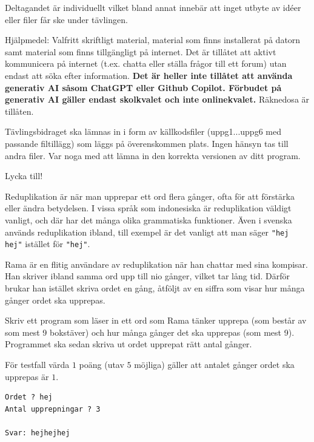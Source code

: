 \begin{lista}
\item Deltagandet är individuellt vilket bland annat innebär att inget utbyte av idéer eller 
filer får ske under tävlingen.  
\item Hjälpmedel: Valfritt skriftligt material, material som finns installerat på datorn samt material som finns tillgängligt på internet.
Det är  tillåtet att aktivt kommunicera på internet (t.ex. chatta eller ställa frågor till ett forum) utan endast att söka efter information.
{\bf Det är heller inte tillåtet att använda generativ AI såsom ChatGPT eller Github Copilot. Förbudet på generativ AI gäller endast skolkvalet och inte onlinekvalet.}
Räknedosa är tillåten.
\item Tävlingsbidraget ska lämnas in i form av källkodsfiler (uppg1...uppg6 med passande filtillägg) som läggs på överenskommen plats. Ingen hänsyn tas till andra filer. Var noga 
med att lämna in den korrekta versionen av ditt program.  
\end{lista}

\begin{center}
\Large Lycka till!
\end{center}
%

\newpage
{}

Reduplikation är när man upprepar ett ord flera gånger, ofta för att förstärka eller ändra betydelsen.
I vissa språk som indonesiska är reduplikation väldigt vanligt, och där har det många olika
grammatiska funktioner. Även i svenska används reduplikation ibland, till exempel är det vanligt
att man säger \texttt{"hej hej"} istället för \texttt{"hej"}.

Rama är en flitig användare av reduplikation när han chattar med sina kompisar. Han skriver ibland samma ord
upp till nio gånger, vilket tar lång tid. Därför brukar han istället skriva ordet en gång, åtföljt av en
siffra som visar hur många gånger ordet ska upprepas.

Skriv ett program som läser in ett ord som Rama tänker upprepa (som består av som mest 9 bokstäver)
och hur många gånger det ska upprepas (som mest 9). 
Programmet ska sedan skriva ut ordet upprepat rätt antal gånger.


 För testfall värda $1$ poäng (utav $5$ möjliga) gäller att antalet gånger ordet ska upprepas är $1$.

\vspace{1cm}
\begin{verbatim}
Ordet ? hej
Antal upprepningar ? 3 

Svar: hejhejhej
\end{verbatim}

